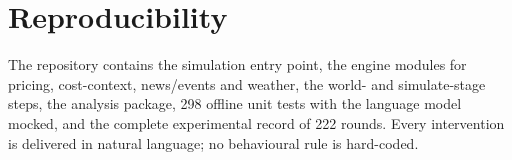 \documentclass[11pt]{article}
\begin{document}
\appendix
\section{Reproducibility}
The repository contains the simulation entry point, the engine modules for pricing, cost-context,
news/events and weather, the world- and simulate-stage steps, the analysis package, 298 offline unit tests
with the language model mocked, and the complete experimental record of 222 rounds. Every intervention is
delivered in natural language; no behavioural rule is hard-coded.
\end{document}
